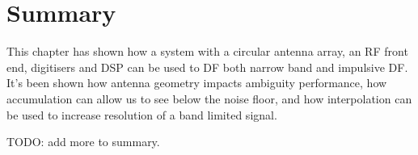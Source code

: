 \section{Summary}
This chapter has shown how a system with a circular antenna array, an RF front end, digitisers and DSP can be used to DF both narrow band and impulsive DF. It's been shown how antenna geometry impacts ambiguity performance, how accumulation can allow us to see below the noise floor, and how interpolation can be used to increase resolution of a band limited signal.

TODO: add more to summary.
